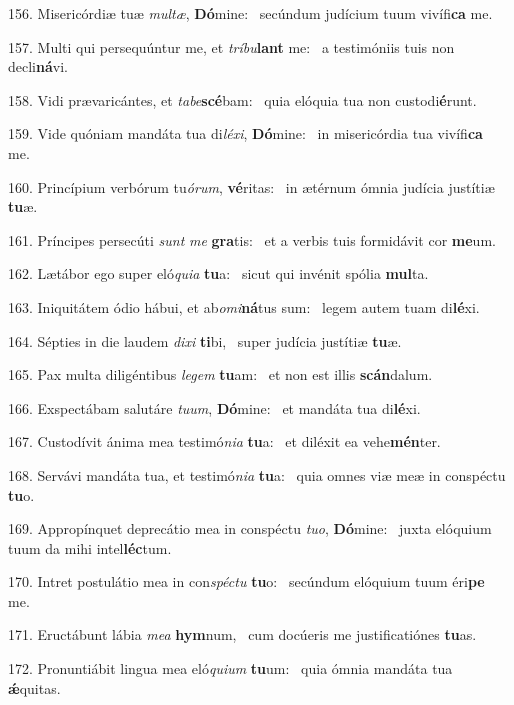 156. Misericórdiæ tuæ \textit{mul}\textit{tæ}, \textbf{Dó}mine: \ast\  secúndum judícium tuum vivífi\textbf{ca} me.\

157. Multi qui persequúntur me, et \textit{trí}\textit{bu}\textbf{lant} me: \ast\  a testimóniis tuis non decli\textbf{ná}vi.\

158. Vidi prævaricántes, et \textit{ta}\textit{be}\textbf{scé}bam: \ast\  quia elóquia tua non custodi\textbf{é}runt.\

159. Vide quóniam mandáta tua di\textit{lé}\textit{xi}, \textbf{Dó}mine: \ast\  in misericórdia tua vivífi\textbf{ca} me.\

160. Princípium verbórum tu\textit{ó}\textit{rum}, \textbf{vé}ritas: \ast\  in ætérnum ómnia judícia justítiæ \textbf{tu}æ.\

161. Príncipes persecúti \textit{sunt} \textit{me} \textbf{gra}tis: \ast\  et a verbis tuis formidávit cor \textbf{me}um.\

162. Lætábor ego super eló\textit{qui}\textit{a} \textbf{tu}a: \ast\  sicut qui invénit spólia \textbf{mul}ta.\

163. Iniquitátem ódio hábui, et ab\textit{o}\textit{mi}\textbf{ná}tus sum: \ast\  legem autem tuam di\textbf{lé}xi.\

164. Sépties in die laudem \textit{di}\textit{xi} \textbf{ti}bi, \ast\  super judícia justítiæ \textbf{tu}æ.\

165. Pax multa diligéntibus \textit{le}\textit{gem} \textbf{tu}am: \ast\  et non est illis \textbf{scán}dalum.\

166. Exspectábam salutáre \textit{tu}\textit{um}, \textbf{Dó}mine: \ast\  et mandáta tua di\textbf{lé}xi.\

167. Custodívit ánima mea testimó\textit{ni}\textit{a} \textbf{tu}a: \ast\  et diléxit ea vehe\textbf{mén}ter.\

168. Servávi mandáta tua, et testimó\textit{ni}\textit{a} \textbf{tu}a: \ast\  quia omnes viæ meæ in conspéctu \textbf{tu}o.\

169. Appropínquet deprecátio mea in conspéctu \textit{tu}\textit{o}, \textbf{Dó}mine: \ast\  juxta elóquium tuum da mihi intel\textbf{léc}tum.\

170. Intret postulátio mea in con\textit{spéc}\textit{tu} \textbf{tu}o: \ast\  secúndum elóquium tuum éri\textbf{pe} me.\

171. Eructábunt lábia \textit{me}\textit{a} \textbf{hym}num, \ast\  cum docúeris me justificatiónes \textbf{tu}as.\

172. Pronuntiábit lingua mea eló\textit{qui}\textit{um} \textbf{tu}um: \ast\  quia ómnia mandáta tua \textbf{ǽ}quitas.\

